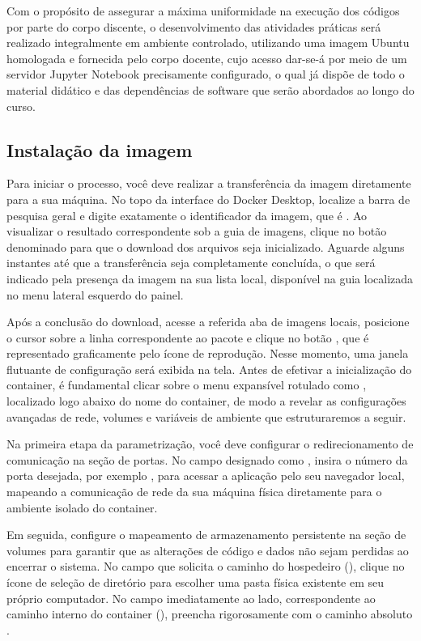 Com o propósito de assegurar a máxima uniformidade na execução dos códigos por parte do corpo discente, o desenvolvimento das atividades práticas será realizado integralmente em ambiente controlado, utilizando uma imagem Ubuntu homologada e fornecida pelo corpo docente, cujo acesso dar-se-á por meio de um servidor Jupyter Notebook precisamente configurado, o qual já dispõe de todo o material didático e das dependências de software que serão abordados ao longo do curso.


\subsection*{Instalação da imagem}

Para iniciar o processo, você deve realizar a transferência da imagem diretamente para a sua máquina. No topo da interface do Docker Desktop, localize a barra de pesquisa geral e digite exatamente o identificador da imagem, que é . Ao visualizar o resultado correspondente sob a guia de imagens, clique no botão denominado  para que o download dos arquivos seja inicializado. Aguarde alguns instantes até que a transferência seja completamente concluída, o que será indicado pela presença da imagem na sua lista local, disponível na guia  localizada no menu lateral esquerdo do painel.

Após a conclusão do download, acesse a referida aba de imagens locais, posicione o cursor sobre a linha correspondente ao pacote  e clique no botão , que é representado graficamente pelo ícone de reprodução. Nesse momento, uma janela flutuante de configuração será exibida na tela. Antes de efetivar a inicialização do container, é fundamental clicar sobre o menu expansível rotulado como , localizado logo abaixo do nome do container, de modo a revelar as configurações avançadas de rede, volumes e variáveis de ambiente que estruturaremos a seguir.

Na primeira etapa da parametrização, você deve configurar o redirecionamento de comunicação na seção de portas. No campo designado como , insira o número da porta desejada, por exemplo , para acessar a aplicação pelo seu navegador local, mapeando a comunicação de rede da sua máquina física diretamente para o ambiente isolado do container.

Em seguida, configure o mapeamento de armazenamento persistente na seção de volumes para garantir que as alterações de código e dados não sejam perdidas ao encerrar o sistema. No campo que solicita o caminho do hospedeiro (), clique no ícone de seleção de diretório para escolher uma pasta física existente em seu próprio computador. No campo imediatamente ao lado, correspondente ao caminho interno do container (), preencha rigorosamente com o caminho absoluto .


